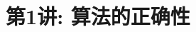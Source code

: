 \documentclass[a4paper, justified]{tufte-handout}
\title{第1讲: 算法的正确性}
\date{\zhtoday} %
\begin{document}
\maketitle
\noplagiarism %
\begin{abstract}
\end{abstract}
\beginrequired

\begin{problem}
\end{problem}
\end{document}
